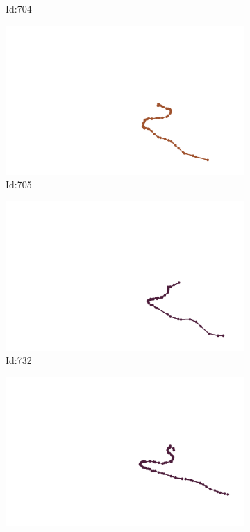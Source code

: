 \documentclass[12pt,twoside]{report}
\begin{document}
\begin{figure}
\begin{subfigure}[b]{0.20\textwidth}
\caption{Id:704}
\end{subfigure}
\begin{subfigure}[b]{0.20\textwidth}
\centering
\includegraphics[width=\textwidth]{../trajectories/705.png}
\caption{Id:705}
\end{subfigure}
\begin{subfigure}[b]{0.20\textwidth}
\centering
\includegraphics[width=\textwidth]{../trajectories/732.png}
\caption{Id:732}
\end{subfigure}
\begin{subfigure}[b]{0.20\textwidth}
\centering
\includegraphics[width=\textwidth]{../trajectories/767.png}

\end{subfigure}
\end{figure}
\end{document}
